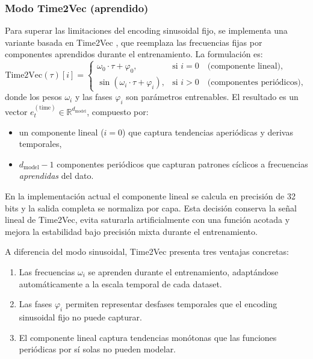 \subsubsection{Modo Time2Vec (aprendido)}
\label{sec:time2vec}

Para superar las limitaciones del encoding sinusoidal fijo, se implementa una variante basada en Time2Vec \cite{kazemi2019time2vec}, que reemplaza las frecuencias fijas por componentes aprendidos durante el entrenamiento. La formulación es:
\[
    \text{Time2Vec}(\tau)[i] =
    \begin{cases}
        \omega_0 \cdot \tau + \varphi_0, & \text{si } i = 0 \quad \text{(componente lineal)}, \\
        \sin(\omega_i \cdot \tau + \varphi_i), & \text{si } i > 0 \quad \text{(componentes periódicos)},
    \end{cases}
\]
donde los pesos $\omega_i$ y las fases $\varphi_i$ son parámetros entrenables. El resultado es un vector $e^{(\text{time})}_t \in \mathbb{R}^{d_{\text{model}}}$, compuesto por:
\begin{itemize}
    \item un componente lineal ($i=0$) que captura tendencias aperiódicas y derivas temporales,
    \item $d_{\text{model}} - 1$ componentes periódicos que capturan patrones cíclicos a frecuencias \emph{aprendidas} del dato.
\end{itemize}

En la implementación actual el componente lineal se calcula en precisión de 32 bits y la salida completa se normaliza por capa. Esta decisión conserva la señal lineal de Time2Vec, evita saturarla artificialmente con una función acotada y mejora la estabilidad bajo precisión mixta durante el entrenamiento.

A diferencia del modo sinusoidal, Time2Vec presenta tres ventajas concretas:
\begin{enumerate}
    \item Las frecuencias $\omega_i$ se aprenden durante el entrenamiento, adaptándose automáticamente a la escala temporal de cada dataset.
    \item Las fases $\varphi_i$ permiten representar desfases temporales que el encoding sinusoidal fijo no puede capturar.
    \item El componente lineal captura tendencias monótonas que las funciones periódicas por sí solas no pueden modelar.
\end{enumerate}

